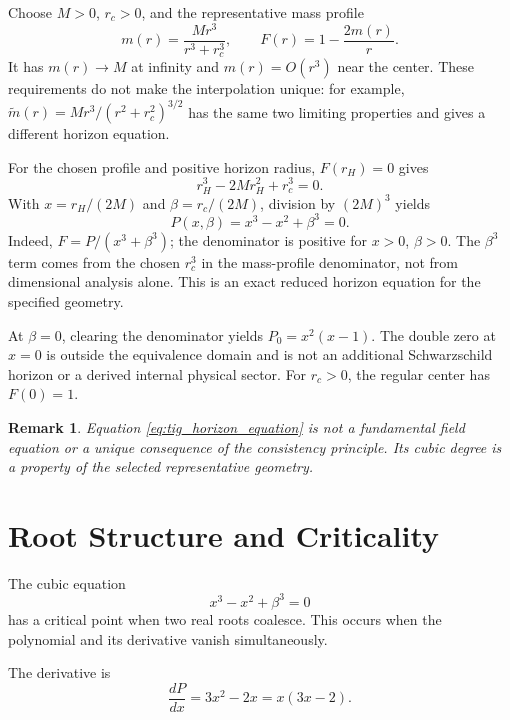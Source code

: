 \documentclass[11pt,a4paper]{article}
\newtheorem{remark}{Remark}
\begin{document}
Choose \(M>0\), \(r_c>0\), and the representative mass profile
\begin{equation}
m(r)=\frac{M r^3}{r^3+r_c^3},\qquad
F(r)=1-\frac{2m(r)}{r}.
\label{eq:chosen_mass_profile}
\end{equation}
It has \(m(r)\to M\) at infinity and \(m(r)=O(r^3)\) near the center.
These requirements do not make the interpolation unique: for example,
\(\widetilde m(r)=M r^3/(r^2+r_c^2)^{3/2}\) has the same two limiting
properties and gives a different horizon equation.

For the chosen profile and positive horizon radius, \(F(r_H)=0\) gives
\begin{equation}
r_H^3-2Mr_H^2+r_c^3=0.
\end{equation}
With \(x=r_H/(2M)\) and \(\beta=r_c/(2M)\), division by \((2M)^3\) yields
\begin{equation}
P(x,\beta)=x^3-x^2+\beta^3=0.
\label{eq:tig_horizon_equation}
\end{equation}
Indeed, \(F=P/(x^3+\beta^3)\); the denominator is positive for
\(x>0\), \(\beta>0\). The \(\beta^3\) term comes from the chosen
\(r_c^3\) in the mass-profile denominator, not from dimensional analysis
alone. This is an exact reduced horizon equation for the specified geometry.

At \(\beta=0\), clearing the denominator yields \(P_0=x^2(x-1)\).
The double zero at \(x=0\) is outside the equivalence domain and is not an
additional Schwarzschild horizon or a derived internal physical sector.
For \(r_c>0\), the regular center has \(F(0)=1\).

\begin{remark}
Equation \eqref{eq:tig_horizon_equation} is not a fundamental field equation
or a unique consequence of the consistency principle. Its cubic degree is a
property of the selected representative geometry.
\end{remark}

\section{Root Structure and Criticality}

The cubic equation
\begin{equation}
x^3-x^2+\beta^3=0
\end{equation}
has a critical point when two real roots coalesce. This occurs when the
polynomial and its derivative vanish simultaneously.

The derivative is
\begin{equation}
\frac{dP}{dx}=3x^2-2x=x(3x-2).
\label{eq:derivative}
\end{equation}
\end{document}
